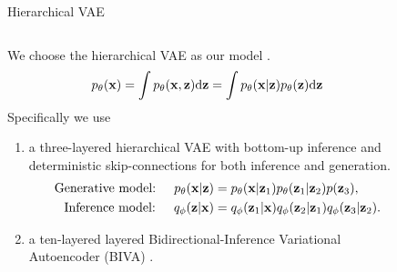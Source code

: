 \begin{frame}{Hierarchical VAE}
  \begin{columns}
      \begin{column}{0.7\textwidth}
          We choose the hierarchical VAE as our model \cite{kingma_autoencoding_2014, rezende_stochastic_2014}.
          \begin{equation*}
              p_\theta({\mathbf{x}}) = \int p_\theta({\mathbf{x}},{\mathbf{z}}) \text{d}{\mathbf{z}} = \int p_\theta({\mathbf{x}}|{\mathbf{z}})p_\theta({\mathbf{z}}) \text{d}{\mathbf{z}}
          \end{equation*}
          Specifically we use
          
          \begin{enumerate}
              \item a three-layered hierarchical VAE with bottom-up inference and deterministic skip-connections for both inference and generation.
              \begin{align*}
                  \text{Generative model: }\quad p_\theta({\mathbf{x}}|{\mathbf{z}}) &= p_\theta({\mathbf{x}}|{\mathbf{z}}_1) p_\theta({\mathbf{z}}_1|{\mathbf{z}}_2) p({\mathbf{z}}_3),\\
                  \text{Inference model: }\quad q_\phi({\mathbf{z}}|{\mathbf{x}}) &= q_\phi({\mathbf{z}}_1|{\mathbf{x}})q_\phi({\mathbf{z}}_2|{\mathbf{z}}_1)q_\phi({\mathbf{z}}_3|{\mathbf{z}}_2).
              \end{align*}
              \item a ten-layered layered Bidirectional-Inference Variational Autoencoder (BIVA) \cite{maaloe_biva_2019}.
          \end{enumerate} 
      \end{column}
      \begin{column}{0.3\textwidth}
          \begin{figure}[.5\textwidth]
\end{figure}
\end{column}
\end{columns}
\end{frame}
